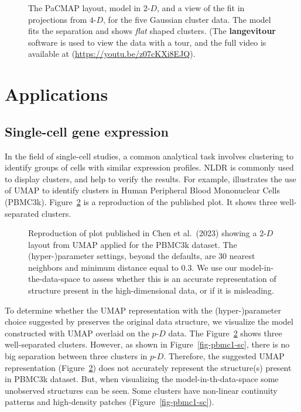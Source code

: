 \documentclass[
  12pt]{article}
\newcommand\pD{$p\text{-}D$}
\newcommand\gD{$2\text{-}D$}
\begin{document}
\begin{figure}[H]
\caption{\label{fig-gau-pacmap-sc}The PaCMAP layout, model in \gD{}, and
a view of the fit in projections from \(4\text{-}D\), for the five
Gaussian cluster data. The model fits the separation and shows
\emph{flat} shaped clusters. (The \textbf{langevitour} software is used
to view the data with a tour, and the full video is available at
(\url{https://youtu.be/z07cKXi8EJQ}).}

\end{figure}%

\section{Applications}\label{sec-applications}

\subsection{Single-cell gene
expression}\label{single-cell-gene-expression}

In the field of single-cell studies, a common analytical task involves
clustering to identify groups of cells with similar expression profiles.
NLDR is commonly used to display clusters, and help to verify the
results. For example, \citet{chen2023} illustrates the use of UMAP to
identify clusters in Human Peripheral Blood Mononuclear Cells (PBMC3k).
Figure~\ref{fig-umap-author} is a reproduction of the published plot. It
shows three well-separated clusters.

\begin{figure}[H]


\caption{\label{fig-umap-author}Reproduction of plot published in Chen
et al.~(2023) showing a \(2\text{-}D\) layout from UMAP applied for the
PBMC3k dataset. The (hyper-)parameter settings, beyond the defaults, are
30 nearest neighbors and minimum distance equal to 0.3. We use our
model-in-the-data-space to assess whether this is an accurate
representation of structure present in the high-dimensional data, or if
it is misleading.}

\end{figure}%

To determine whether the UMAP representation with the (hyper-)parameter
choice suggested by \citet{chen2023} preserves the original data
structure, we visualize the model constructed with UMAP overlaid on the
\pD{} data. The Figure~\ref{fig-umap-author} shows three well-separated
clusters. However, as shown in Figure~\ref{fig-pbmc1-sc}, there is no
big separation between three clusters in \pD{}. Therefore, the suggested
UMAP representation (Figure~\ref{fig-umap-author}) does not accurately
represent the structure(s) present in PBMC3k dataset. But, when
visualizing the model-in-th-data-space some unobserved structures can be
seen. Some clusters have non-linear continuity patterns and high-density
patches (Figure~\ref{fig-pbmc1-sc}).
\end{document}
